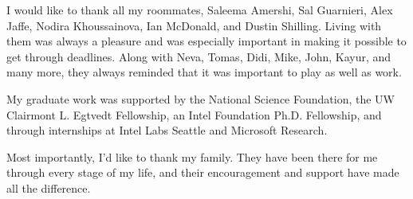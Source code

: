 {  I would like to thank all my roommates, Saleema Amershi, Sal Guarnieri, Alex Jaffe, Nodira Khoussainova, Ian McDonald, and Dustin Shilling. Living with them was always a pleasure and was especially important in making it possible to get through deadlines. Along with Neva, Tomas, Didi, Mike, John, Kayur, and many more, they always reminded that it was important to play as well as work.
  
  My graduate work was supported by the National Science Foundation, the UW Clairmont L. Egtvedt Fellowship, an Intel Foundation Ph.D. Fellowship, and through internships at Intel Labs Seattle and Microsoft Research.
  
  Most importantly, I'd like to thank my family. They have been there for me through every stage of my life, and their encouragement and support have made all the difference.
}